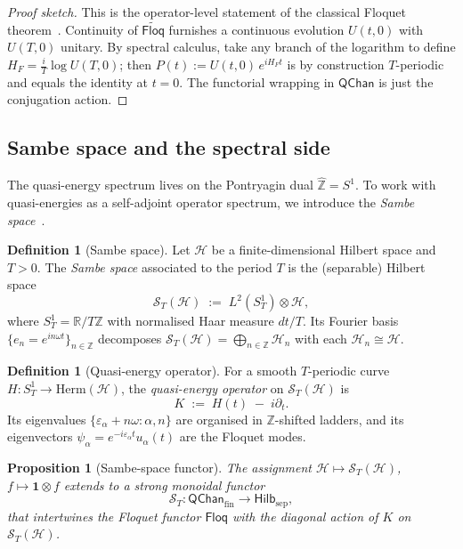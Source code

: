 \documentclass[12pt]{article}
\newtheorem{proposition}[theorem]{Proposition}
\theoremstyle{definition}
\newtheorem{definition}[theorem]{Definition}
\theoremstyle{remark}
\newcommand{\Hcal}{\mathcal{H}}
\newcommand{\Z}{\mathbb{Z}}
\newcommand{\R}{\mathbb{R}}
\newcommand{\one}{\mathbf{1}}
\newcommand{\HF}{H_{F}}
\newcommand{\Floq}{\mathsf{Floq}}
\newcommand{\QChan}{\mathsf{QChan}}
\newcommand{\Hilb}{\mathsf{Hilb}}
\begin{document}
\begin{proof}[Proof sketch]
This is the operator-level statement of the classical Floquet theorem~\cite{floquet1883}. Continuity of $\widetilde{\Floq}$ furnishes a continuous evolution $U(t,0)$ with $U(T,0)$ unitary. By spectral calculus, take any branch of the logarithm to define $\HF=\frac{i}{T}\log U(T,0)$; then $P(t):=U(t,0)\,e^{i\HF t}$ is by construction $T$-periodic and equals the identity at $t=0$. The functorial wrapping in $\QChan$ is just the conjugation action.
\end{proof}

\subsection{Sambe space and the spectral side}

The quasi-energy spectrum lives on the Pontryagin dual $\widehat{\Z}=S^1$. To work with quasi-energies as a self-adjoint operator spectrum, we introduce the \emph{Sambe space}~\cite{sambe1973}.

\begin{definition}[Sambe space]
\label{def:sambe}
Let $\Hcal$ be a finite-dimensional Hilbert space and $T>0$. The \emph{Sambe space} associated to the period $T$ is the (separable) Hilbert space
\begin{equation}
\mathcal{S}_T(\Hcal) \;:=\; L^2(S^1_T)\otimes\Hcal,
\end{equation}
where $S^1_T = \R/T\Z$ with normalised Haar measure $dt/T$. Its Fourier basis $\{e_n=e^{i n\omega t}\}_{n\in\Z}$ decomposes $\mathcal{S}_T(\Hcal)=\bigoplus_{n\in\Z}\Hcal_n$ with each $\Hcal_n\cong\Hcal$.
\end{definition}

\begin{definition}[Quasi-energy operator]
\label{def:quasi-energy}
For a smooth $T$-periodic curve $H\colon S^1_T\to\mathrm{Herm}(\Hcal)$,
the \emph{quasi-energy operator} on $\mathcal{S}_T(\Hcal)$ is
\begin{equation}
K \;:=\; H(t)\;-\;i\partial_t.
\end{equation}
Its eigenvalues $\{\varepsilon_\alpha+n\omega : \alpha,n\}$ are organised in $\Z$-shifted ladders, and its eigenvectors $\psi_\alpha=e^{-i\varepsilon_\alpha t}u_\alpha(t)$ are the Floquet modes.
\end{definition}

\begin{proposition}[Sambe-space functor]
\label{prop:sambe-functor}
The assignment $\Hcal\mapsto\mathcal{S}_T(\Hcal)$, $f\mapsto\one\otimes f$ extends to a strong monoidal functor
\begin{equation}
\mathcal{S}_T\colon \QChan_{\mathrm{fin}} \longrightarrow \Hilb_{\mathrm{sep}},
\end{equation}
that intertwines the Floquet functor $\Floq$ with the diagonal action of $K$ on $\mathcal{S}_T(\Hcal)$.
\end{proposition}
\end{document}
